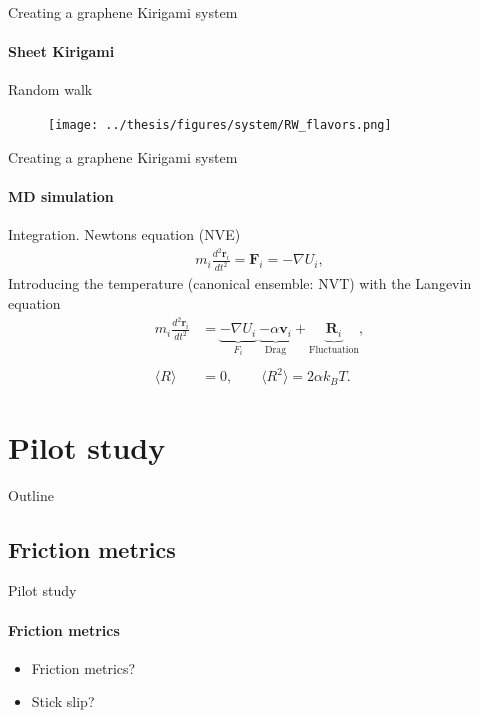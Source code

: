 \documentclass[
	10pt, %
]{beamer}
\renewcommand{\vec}[1]{\mathbf{#1}} %
\begin{document}
%
%
\begin{frame}{Creating a graphene Kirigami system}
	\framesubtitle{Sheet Kirigami}
	Random walk 
	\begin{figure}[H]
		\centering
		\texttt{[image: ../thesis/figures/system/RW\_flavors.png]}
	\end{figure}
\end{frame}
%
%
\begin{frame}{Creating a graphene Kirigami system}
	\framesubtitle{MD simulation}
	Integration. Newtons equation (NVE)
	\begin{align*}
		m_i \frac{d^2 \vec{r}_i}{dt^2} = \vec{F}_i = -\nabla U_i,
	\end{align*}
	Introducing the temperature (canonical ensemble: NVT) with the Langevin equation
	\begin{align*}
		m_i \frac{d^2 \vec{r}_i}{dt^2} &= \underbrace{-\nabla U_i}_{F_i} \ \underbrace{-\alpha \vec{v}_i}_{\text{Drag}}  + \underbrace{\vec{R}_i}_{\text{Fluctuation}}, \\
		\\
		\langle R \rangle &= 0, \qquad \langle R^2 \rangle = 2\alpha k_B T.
	\end{align*}

\end{frame}


\section{Pilot study} %
\begin{frame}{Outline}
    \tableofcontents[currentsection]
\end{frame}

\subsection{Friction metrics}
\begin{frame}{Pilot study}
	\framesubtitle{Friction metrics}

	\begin{itemize}
		\item Friction metrics?
		\item Stick slip?
	\end{itemize}
\end{frame}
%
%
\end{document}
